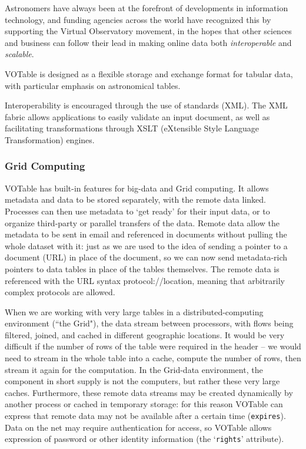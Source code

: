 \documentclass[11pt,a4paper]{ivoa}
\let\fg=\color
\def\attr#1{{\tt{\fg{DarkRed}#1}}}
\begin{document}
Astronomers have always been at the forefront of developments in
information technology, and funding agencies across the world have
recognized this by supporting the Virtual Observatory movement, in
the hopes that other sciences and business can follow their lead in
making online data both {\it interoperable} and {\it scalable}.

VOTable is designed as a flexible storage and exchange format for
tabular data, with particular emphasis on astronomical tables.

Interoperability is encouraged through the use of standards (XML).
The XML fabric
allows applications to easily validate an input document, as well as
facilitating transformations through XSLT (eXtensible Style Language
Transformation) engines.

\subsubsection*{Grid Computing}

VOTable has built-in features for big-data and Grid computing. It
allows metadata and data to be stored separately, with the remote
data linked. %
Processes can then use
metadata to `get ready' for their input data, or to organize
third-party or parallel transfers of the data. Remote data allow the
metadata to be sent in email and referenced in documents without
pulling the whole dataset with it: just as we are used to the idea of
sending a pointer to a document (URL) in place of the document, so we
can now send metadata-rich pointers to data tables in place of the
tables themselves. The remote data is referenced with the URL syntax
\textsf{protocol://location},
meaning that arbitrarily complex protocols are allowed.

When we are working with very large tables in a
distributed-computing environment (``the Grid"), the data
stream between processors, with flows being filtered, joined, and
cached in different geographic locations. It would be very difficult
if the number of rows of the table were required in the header --
we would need to stream in the whole table into a cache, compute the
number of rows, then stream it again for the computation. In the
Grid-data environment, the component in short supply is not the
computers, but rather these very large caches. Furthermore, these
remote data streams may be created dynamically by another process or
cached in temporary storage: for this reason VOTable can express that
remote data may not be available after a certain time (\attr{expires}).
Data on the net may require authentication for access, so VOTable
allows expression of password or other identity information (the
`{\attr{rights}}'
attribute).
\end{document}
